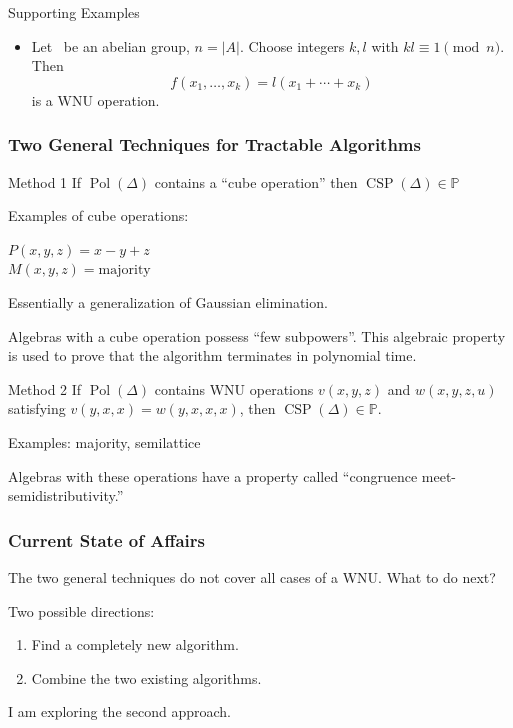 \documentclass[12pt,xcolor=dvipsnames%
   ]{beamer}
\DeclareMathOperator{\CSP}{CSP}
\DeclareMathOperator{\Pol}{Pol}
\renewcommand{\.}{\cdot}
\renewcommand{\P}{\ensuremath{\mathbb{P}}\xspace}
\begin{document}
\begin{frame}
\begin{overprint}
\begin{exampleblock}{Supporting Examples}
\begin{itemize}
             \item<6-> Let \A\ be an abelian group, $n=|A|$. Choose
        integers $k, l$ with $kl \equiv 1 \pmod n$. Then
        \begin{equation*}
          f(x_1,\dots,x_k) = l(x_1+\cdots + x_k)
        \end{equation*}
        is a WNU operation.
      \end{itemize}
    \end{exampleblock}
  \end{overprint}
\end{frame}

\begin{frame}
\frametitle{Two General Techniques for Tractable Algorithms}
\begin{exampleblock}{Method 1}
If $\Pol(\Delta)$ contains a ``cube operation'' then $\CSP(\Delta)\in \P$
\end{exampleblock}

\pause
Examples of cube operations: 

$P(x,y,z) = x-y+z$\\
$M(x,y,z) = \text{majority}$

Essentially a generalization of Gaussian elimination. 

Algebras with a cube operation possess ``few subpowers''. This algebraic property is used to prove that the algorithm terminates in polynomial time.

\end{frame}

\begin{frame}
\begin{exampleblock}{Method 2}
If $\Pol(\Delta)$ contains WNU operations $v(x,y,z)$ and $w(x,y,z,u)$ satisfying $v(y,x,x)= w(y,x,x,x)$, then $\CSP(\Delta)\in \P$.
\end{exampleblock}

\pause
Examples: majority, semilattice 

Algebras with these operations have a property called ``congruence meet-semidistributivity.'' 

\end{frame}

\begin{frame}
\frametitle{Current State of Affairs}
The two general techniques do not cover all cases of a WNU. What to do next? 

\medskip
Two possible directions:
\begin{enumerate}
\item Find a completely new algorithm.
\item Combine the two existing algorithms.
\end{enumerate}

I am exploring the second approach.
\end{frame}
\end{document}
